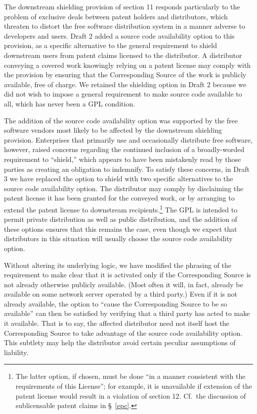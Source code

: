 The downstream shielding provision of section 11 responds particularly
to the problem of exclusive deals between patent holders and
distributors, which threaten to distort the free software distribution
system in a manner adverse to developers and users. Draft 2 added a
source code availability option to this provision, as a specific
alternative to the general requirement to shield downstream users from
patent claims licensed to the distributor. A distributor conveying a
covered work knowingly relying on a patent license may comply with the
provision by ensuring that the Corresponding Source of the work is
publicly available, free of charge.  We retained the shielding option in
Draft 2 because we did not wish to impose a general requirement to make
source code available to all, which has never been a GPL condition.

The addition of the source code availability option was supported by the
free software vendors most likely to be affected by the downstream
shielding provision.  Enterprises that primarily use and occasionally
distribute free software, however, raised concerns regarding the
continued inclusion of a broadly-worded requirement to ``shield,'' which
appears to have been mistakenly read by those parties as creating an
obligation to indemnify.  To satisfy these concerns, in Draft 3 we have
replaced the option to shield with two specific alternatives to the
source code availability option. The distributor may comply by
disclaiming the patent license it has been granted for the conveyed
work, or by arranging to extend the patent license to downstream
recipients.\footnote{The latter option, if chosen, must be done ``in a
manner consistent with the requirements of this License''; for example,
it is unavailable if extension of the patent license would result in a
violation of section 12. Cf.~the discussion of sublicensable patent
claims in \S\ \ref{epc}.}  The GPL is intended to permit private
distribution as well as public distribution, and the addition of these
options ensures that this remains the case, even though we expect that
distributors in this situation will usually choose the source code
availability option.

Without altering its underlying logic, we have modified the phrasing of
the requirement to make clear that it is activated only if the
Corresponding Source is not already otherwise publicly available.  (Most
often it will, in fact, already be available on some network server
operated by a third party.)  Even if it is not already available, the
option to ``cause the Corresponding Source to be so available'' can then
be satisfied by verifying that a third party has acted to make it
available.  That is to say, the affected distributor need not itself
host the Corresponding Source to take advantage of the source code
availability option.  This subtlety may help the distributor avoid
certain peculiar assumptions of liability.

